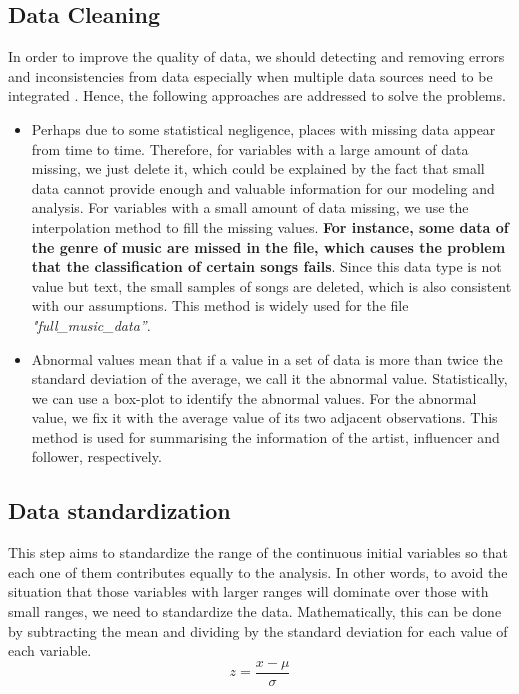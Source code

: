 \documentclass[12pt]{article}
\begin{document}
\subsection{Data Cleaning}
In order to improve the quality of data, we should detecting and removing errors and inconsistencies from data especially when multiple data sources need to be integrated \cite{article8}. Hence, the following approaches are addressed to solve the problems.
\begin{itemize}
\item Perhaps due to some statistical negligence, places with missing data appear from time to time. Therefore, for variables with a large amount of data missing, we just delete it, which could be explained by the fact that small data cannot provide enough and valuable information for our modeling and analysis. For variables with a small amount of data missing, we use the interpolation method to fill the missing values. \textbf{For instance, some data of the genre of music are missed in the file, which causes the problem that the classification of certain songs fails}. Since this data type is not value but text, the small samples of songs are deleted, which is also consistent with our assumptions. This method is widely used for the file \emph{"full\_music\_data”}.
\item Abnormal values mean that if a value in a set of data is more than twice the standard deviation of the average, we call it the abnormal value. Statistically, we can use a box-plot to identify the abnormal values. For the abnormal value, we fix it with the average value of its two adjacent observations. This method is used for summarising the information of the artist, influencer and follower, respectively.
\end{itemize} 
\subsection{Data standardization}
This step aims to standardize the range of the continuous initial variables so that each one of them contributes equally to the analysis. In other words, to avoid the situation that those variables with larger ranges will dominate over those with small ranges, we need to standardize the data.
Mathematically, this can be done by subtracting the mean and dividing by the standard deviation for each value of each variable.\\

\begin{equation}
z =\frac{x-\mu}{\sigma}
\end{equation}
\end{document}
